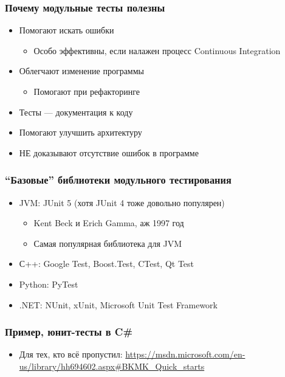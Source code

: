 \documentclass{../../slides-style}
\begin{document}
    \begin{frame}
        \frametitle{Почему модульные тесты полезны}
        \begin{itemize}
            \item Помогают искать ошибки
            \begin{itemize}
                \item Особо эффективны, если налажен процесс Continuous Integration
            \end{itemize}
            \item Облегчают изменение программы
            \begin{itemize}
                \item Помогают при рефакторинге
            \end{itemize}
            \item Тесты --- документация к коду
            \item Помогают улучшить архитектуру
            \item НЕ доказывают отсутствие ошибок в программе
        \end{itemize}
    \end{frame}

    \begin{frame}
        \frametitle{``Базовые'' библиотеки модульного тестирования}
        \begin{itemize}
            \item JVM: JUnit 5 (хотя JUnit 4 тоже довольно популярен)
            \begin{itemize}
                \item Kent Beck и Erich Gamma, аж 1997 год
                \item Самая популярная библиотека для JVM
            \end{itemize}
            \item С++: Google Test, Boost.Test, CTest, Qt Test
            \item Python: PyTest
            \item .NET: NUnit, xUnit, Microsoft Unit Test Framework
        \end{itemize}
    \end{frame}

    \begin{frame}
        \frametitle{Пример, юнит-тесты в C\#}
        \begin{itemize}
            \item Для тех, кто всё пропустил: \url{https://msdn.microsoft.com/en-us/library/hh694602.aspx\#BKMK\_Quick\_starts}
        \end{itemize}
    \end{frame}
\end{document}
